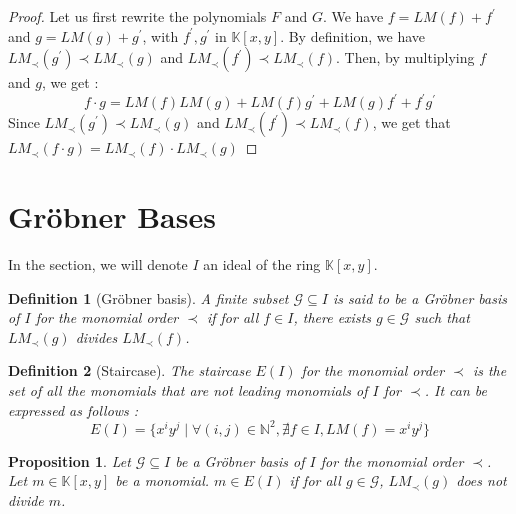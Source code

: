 \documentclass{article}
\newtheorem{definition}{Definition}[section]
\newtheorem{proposition}{Proposition}[section]
\begin{document}
\begin{proof}
    Let us first rewrite the polynomials $F$ and $G$. We have $f = LM(f) + f^{\prime}$ and $g = LM(g) + g^{\prime}$, with $f^{\prime}, g^{\prime}$ in $\mathbb{K}[x, y]$. By definition, we have  $LM_{\prec}(g^{\prime}) \prec LM_{\prec}(g)$ and $LM_{\prec}(f^{\prime}) \prec LM_{\prec}(f)$. Then, by multiplying $f$ and $g$, we get :
    \begin{displaymath}
        f \cdot g = LM(f)LM(g) + LM(f)g^{\prime} + LM(g)f^{\prime} + f^{\prime}g^{\prime}
    \end{displaymath}
    Since $LM_{\prec}(g^{\prime}) \prec LM_{\prec}(g)$ and $LM_{\prec}(f^{\prime}) \prec LM_{\prec}(f)$, we get that $LM_{\prec}(f \cdot g) = LM_{\prec}(f) \cdot LM_{\prec}(g)$ 
\end{proof}

\section{Gröbner Bases}

In the section, we will denote $I$ an ideal of the ring $\mathbb{K}[x, y]$.

\begin{definition}[Gröbner basis]
    A finite subset $\mathscr{G} \subseteq I$ is said to be a Gröbner basis of $I$ for the monomial order $\prec$ if for all $f \in I$, there exists $g \in \mathscr{G}$ such that $LM_{\prec}(g)$ divides $LM_{\prec}(f)$. 
\end{definition}

\begin{definition}[Staircase]
    The staircase $E(I)$ for the monomial order $\prec$ is the set of all the monomials that are not leading monomials of $I$ for $\prec$. It can be expressed as follows : 
    \begin{displaymath}
        E(I) = \{ x^{i}y^{j} \mid \forall (i, j) \in \mathbb{N}^{2}, \nexists f \in I, LM(f) = x^{i}y^{j}\}
    \end{displaymath}
\end{definition}

\begin{proposition} \label{proposition:monomial-in-staircase}
    Let $\mathscr{G} \subseteq I$ be a Gröbner basis of $I$ for the monomial order $\prec$. Let $m \in \mathbb{K}[x,y]$ be a monomial. $m \in E(I)$ if for all $g \in \mathscr{G}$, $LM_{\prec}(g)$ does not divide $m$.
\end{proposition}
\end{document}
